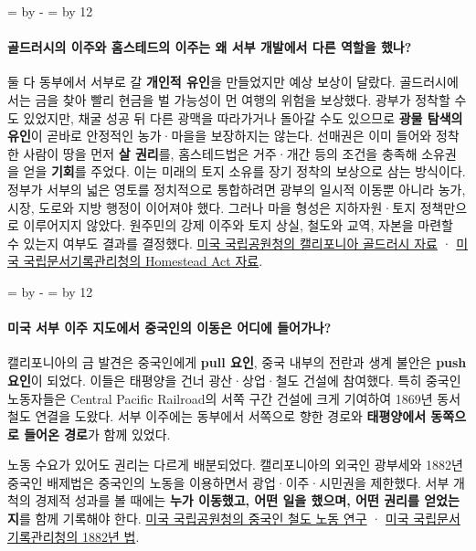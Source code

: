 \documentclass[10pt,a4paper]{article}
\newcommand{\ReserveQuestionSpace}{%
  \par\begingroup
  \dimen0=\pagegoal \advance\dimen0 by -\pagetotal
  \dimen2=\baselineskip \multiply\dimen2 by 12
  \ifdim\dimen0<\dimen2 \newpage\fi
  \endgroup}
\begin{document}
\ReserveQuestionSpace
\paragraph{골드러시의 이주와 홈스테드의 이주는 왜 서부 개발에서 다른 역할을 했나?}
둘 다 동부에서 서부로 갈 \textbf{개인적 유인}을 만들었지만 예상 보상이 달랐다. 골드러시에서는 금을 찾아 빨리 현금을 벌 가능성이 먼 여행의 위험을 보상했다. 광부가 정착할 수도 있었지만, 채굴 성공 뒤 다른 광맥을 따라가거나 돌아갈 수도 있으므로 \textbf{광물 탐색의 유인}이 곧바로 안정적인 농가·마을을 보장하지는 않는다. 선매권은 이미 들어와 정착한 사람이 땅을 먼저 \textbf{살 권리}를, 홈스테드법은 거주·개간 등의 조건을 충족해 소유권을 얻을 \textbf{기회}를 주었다. 이는 미래의 토지 소유를 장기 정착의 보상으로 삼는 방식이다. 정부가 서부의 넓은 영토를 정치적으로 통합하려면 광부의 일시적 이동뿐 아니라 농가, 시장, 도로와 지방 행정이 이어져야 했다. 그러나 마을 형성은 지하자원·토지 정책만으로 이루어지지 않았다. 원주민의 강제 이주와 토지 상실, 철도와 교역, 자본을 마련할 수 있는지 여부도 결과를 결정했다. \href{https://www.nps.gov/cali/learn/historyculture/california-gold-rush.htm}{미국 국립공원청의 캘리포니아 골드러시 자료} · \href{https://www.archives.gov/milestone-documents/homestead-act}{미국 국립문서기록관리청의 Homestead Act 자료}.\par

\ReserveQuestionSpace
\paragraph{미국 서부 이주 지도에서 중국인의 이동은 어디에 들어가나?}
캘리포니아의 금 발견은 중국인에게 \textbf{pull 요인}, 중국 내부의 전란과 생계 불안은 \textbf{push 요인}이 되었다. 이들은 태평양을 건너 광산·상업·철도 건설에 참여했다. 특히 중국인 노동자들은 Central Pacific Railroad의 서쪽 구간 건설에 크게 기여하여 1869년 동서 철도 연결을 도왔다. 서부 이주에는 동부에서 서쪽으로 향한 경로와 \textbf{태평양에서 동쪽으로 들어온 경로}가 함께 있었다.\par

노동 수요가 있어도 권리는 다르게 배분되었다. 캘리포니아의 외국인 광부세와 1882년 중국인 배제법은 중국인의 노동을 이용하면서 광업·이주·시민권을 제한했다. 서부 개척의 경제적 성과를 볼 때에는 \textbf{누가 이동했고, 어떤 일을 했으며, 어떤 권리를 얻었는지}를 함께 기록해야 한다. \href{https://www.nps.gov/gosp/learn/historyculture/chinese-labor-and-the-iron-road.htm}{미국 국립공원청의 중국인 철도 노동 연구} · \href{https://www.archives.gov/milestone-documents/chinese-exclusion-act}{미국 국립문서기록관리청의 1882년 법}.\par
\end{document}
